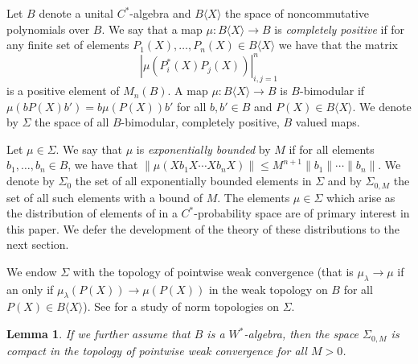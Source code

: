 \documentclass[11pt]{amsart}
\newtheorem{lemma}[theorem]{Lemma}
\begin{document}
Let $B$ denote a unital $C^{\ast}$-algebra and $B\langle X \rangle$ the space of noncommutative polynomials over $B$.
  We say that a map $\mu: B\langle X \rangle \rightarrow B$ is \textit{completely positive} if for any finite set of
elements $P_{1}(X), \ldots, P_{n}(X) \in B\langle X \rangle$ we have that the matrix $$|\mu(P_{i}^{\ast}(X)P_{j}(X)) |_{i,j=1}^{n}$$ is a positive element of $M_{n}(B)$.
A map $\mu: B\langle X \rangle \rightarrow B$ is $B$-bimodular if $\mu(bP(X)b') = b\mu(P(X))b'$ for all $b,b' \in B$ and $P(X) \in B\langle X \rangle$.  We denote
by $\Sigma$ the space of all $B$-bimodular, completely positive, $B$ valued maps.

Let $\mu \in \Sigma$.  We say that $\mu$ is \textit{exponentially bounded} by $M$ if for all elements $b_{1}, \ldots, b_{n} \in B$, we have that
 $\| \mu(Xb_{1}X \cdots Xb_{n}X) \| \leq M^{n+1} \|b_{1} \| \cdots \|b_{n} \|$.  We denote by $\Sigma_{0}$ the set of all exponentially bounded elements
in $\Sigma$ and by $\Sigma_{0,M}$ the set of all such elements with a bound of $M$.  The elements $\mu \in \Sigma$ which arise as the distribution of elements of 
in a $C^{\ast}$-probability space are of primary interest in this paper.  We defer the development of the theory of these distributions to the next section.


We endow $\Sigma$ with the topology of pointwise weak convergence 
(that is $\mu_{\lambda} \rightarrow \mu$ if an only if $\mu_{\lambda} (P(X)) \rightarrow \mu(P(X))$
in the weak topology on $B$ for all $P(X) \in B\langle X \rangle$).  See \cite{PV} for a study of norm topologies on $\Sigma$.

\begin{lemma}\label{compact}
If we further assume that $B$ is a $W^{\ast}$-algebra, then the space $\Sigma_{0,M}$ is compact in the topology of pointwise weak convergence for all $M > 0$.
\end{lemma}
\end{document}

